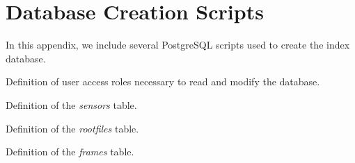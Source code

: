 \chapter{Database Creation Scripts}
In this appendix, we include several PostgreSQL scripts used to create the index database.

\newpage
\begin{listing}[H]
    \caption{Definition of user access roles necessary to read and modify the database.}
    \label{lst:sql-security}
\end{listing}

\newpage
\begin{listing}[H]
    \caption{Definition of the \textit{sensors} table.}
    \label{lst:sql-sensors}
\end{listing}

\newpage
\begin{listing}[H]
    \caption{Definition of the \textit{rootfiles} table.}
    \label{lst:sql-rootfiles}
\end{listing}

\newpage
\begin{listing}[H]
    \caption{Definition of the \textit{frames} table.}
    \label{lst:sql-frames}
\end{listing}
